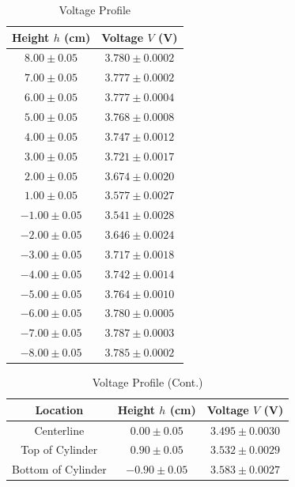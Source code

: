 \documentclass[journal,letterpaper]{IEEEtran}
\begin{document}
\begin{table}[H]
    \centering
    \caption{Voltage Profile}
    \begin{tabular}{cc}
    \toprule
    Height $h$ (cm) & Voltage $V$ (V) \\ \midrule \midrule
    $8.00 \pm 0.05 $ & $3.780 \pm 0.0002$ \\
    $7.00 \pm 0.05 $ & $3.777 \pm 0.0002$ \\
    $6.00 \pm 0.05 $ & $3.777 \pm 0.0004$ \\
    $5.00 \pm 0.05 $ & $3.768 \pm 0.0008$ \\
    $4.00 \pm 0.05 $ & $3.747 \pm 0.0012$ \\
    $3.00 \pm 0.05 $ & $3.721 \pm 0.0017$ \\
    $2.00 \pm 0.05 $ & $3.674 \pm 0.0020$ \\
    $1.00 \pm 0.05 $ & $3.577 \pm 0.0027$ \\
    $-1.00 \pm 0.05$ & $3.541 \pm 0.0028$ \\
    $-2.00 \pm 0.05$ & $3.646 \pm 0.0024$ \\
    $-3.00 \pm 0.05$ & $3.717 \pm 0.0018$ \\
    $-4.00 \pm 0.05$ & $3.742 \pm 0.0014$ \\
    $-5.00 \pm 0.05$ & $3.764 \pm 0.0010$ \\
    $-6.00 \pm 0.05$ & $3.780 \pm 0.0005$ \\
    $-7.00 \pm 0.05$ & $3.787 \pm 0.0003$ \\
    $-8.00 \pm 0.05$ & $3.785 \pm 0.0002$ \\ \bottomrule
    \end{tabular}
    \label{tab:voltage}
\end{table}

\begin{table}[H]
    \centering
    \caption{Voltage Profile (Cont.)}
    \begin{tabular}{ccc}
    \toprule
    Location & Height $h$ (cm) & Voltage $V$ (V) \\ \midrule \midrule
    Centerline & $0.00 \pm 0.05$ & $3.495 \pm 0.0030$ \\
    Top of Cylinder & $0.90 \pm 0.05$ & $3.532 \pm 0.0029$ \\
    Bottom of Cylinder & $-0.90 \pm 0.05$ & $3.583 \pm 0.0027$ \\ \bottomrule
    \end{tabular}
    \label{tab:voltages}
\end{table}
\end{document}
